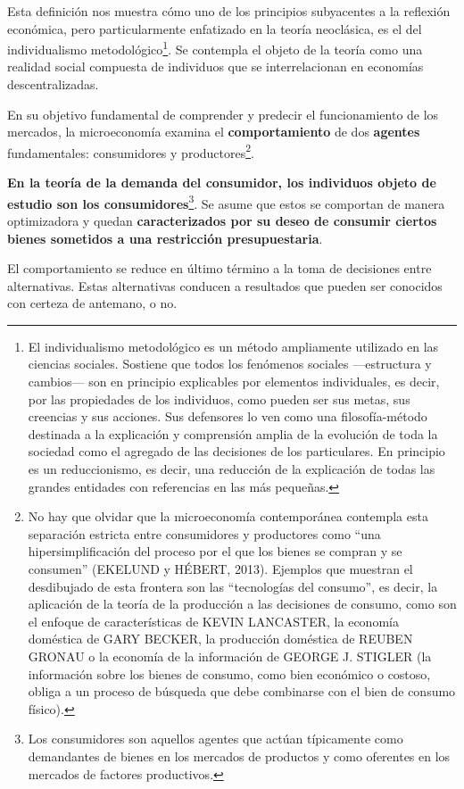 \documentclass[10pt,a4paper]{article}
\begin{document}
Esta definición nos muestra cómo uno de los principios subyacentes a la reflexión económica, pero particularmente enfatizado en la teoría neoclásica, es el del individualismo metodológico\footnote{%
    El individualismo metodológico es un método ampliamente utilizado en las ciencias sociales. Sostiene que todos los fenómenos sociales —estructura y cambios— son en principio explicables por elementos individuales, es decir, por las propiedades de los individuos, como pueden ser sus metas, sus creencias y sus acciones. Sus defensores lo ven como una filosofía-método destinada a la explicación y comprensión amplia de la evolución de toda la sociedad como el agregado de las decisiones de los particulares. En principio es un reduccionismo, es decir, una reducción de la explicación de todas las grandes entidades con referencias en las más pequeñas.
}. Se contempla el objeto de la teoría como una realidad social compuesta de individuos que se interrelacionan en economías descentralizadas.

En su objetivo fundamental de comprender y predecir el funcionamiento de los mercados, la microeconomía examina el \textbf{comportamiento} de dos \textbf{agentes} fundamentales: consumidores y productores\footnote{%
    No hay que olvidar que la microeconomía contemporánea contempla esta separación estricta entre consumidores y productores como “una hipersimplificación del proceso por el que los bienes se compran y se consumen” (EKELUND y HÉBERT, 2013). Ejemplos que muestran el desdibujado de esta frontera son las “tecnologías del consumo”, es decir, la aplicación de la teoría de la producción a las decisiones de consumo, como son el enfoque de características de KEVIN LANCASTER, la economía doméstica de GARY BECKER, la producción doméstica de REUBEN GRONAU o la economía de la información de GEORGE J. STIGLER (la información sobre los bienes de consumo, como bien económico o costoso, obliga a un proceso de búsqueda que debe combinarse con el bien de consumo físico).
}.

\textbf{En la teoría de la demanda del consumidor, los individuos objeto de estudio son los consumidores}\footnote{%
    Los consumidores son aquellos agentes que actúan típicamente como demandantes de bienes en los mercados de productos y como oferentes en los mercados de factores productivos.
}. Se asume que estos se comportan de manera optimizadora y quedan \textbf{caracterizados por su deseo de consumir ciertos bienes sometidos a una restricción presupuestaria}.

El comportamiento se reduce en último término a la toma de decisiones entre alternativas. Estas alternativas conducen a resultados que pueden ser conocidos con certeza de antemano, o no.
\end{document}
